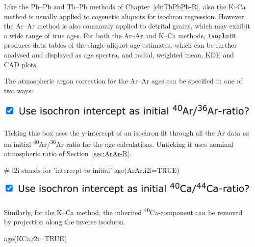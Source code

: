 \begin{refsection}
Like the Pb--Pb and Th--Pb methods of Chapter~\ref{ch:ThPbPb-R}, also
the K--Ca method is usually applied to cogenetic aliquots for isochron
regression. However the Ar--Ar method is also commonly applied to
detrital grains, which may exhibit a wide range of true ages.  For
both the Ar--Ar and K--Ca methods, \texttt{IsoplotR} produces data
tables of the single aliquot age estimates, which can be further
analysed and displayed as age spectra, and radial, weighted mean, KDE
and CAD plots.

The atmospheric argon correction for the Ar--Ar ages can be specified
in one of two ways:\\

\noindent\begin{minipage}[t]{.5\linewidth}
\strut\vspace*{-\baselineskip}\newline
\includegraphics[width=\linewidth]{../figures/ArAri2i.png}
\end{minipage}
\begin{minipage}[t]{.5\linewidth}
Ticking this box uses the y-intercept of an isochron fit through all
the Ar data as an initial
\textsuperscript{40}Ar/\textsuperscript{36}Ar-ratio for the age
calculations. Unticking it uses nominal atmospheric ratio of
Section~\ref{sec:ArAr-R}.
\end{minipage}

\begin{script}
# i2i stands for 'intercept to initial'
age(ArAr,i2i=TRUE) 
\end{script}

\noindent\begin{minipage}[t]{.5\linewidth}
\strut\vspace*{-\baselineskip}\newline
\includegraphics[width=\linewidth]{../figures/KCai2i.png}
\end{minipage}
\begin{minipage}[t]{.5\linewidth}
Similarly, for the K--Ca method, the inherited
\textsuperscript{40}Ca-component can be removed by projection along
the inverse isochron.
\end{minipage}

\begin{console}
age(KCa,i2i=TRUE)
\end{console}


\end{refsection}
